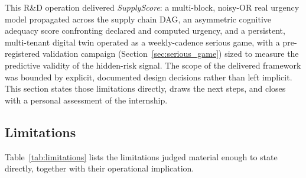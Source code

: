 This R\&D operation delivered \emph{SupplyScore}: a multi-block, noisy-OR real urgency model propagated across the supply chain DAG, an asymmetric cognitive adequacy score confronting declared and computed urgency, and a persistent, multi-tenant digital twin operated as a weekly-cadence serious game, with a pre-registered validation campaign (Section~\ref{sec:serious_game}) sized to measure the predictive validity of the hidden-risk signal. The scope of the delivered framework was bounded by explicit, documented design decisions rather than left implicit. This section states those limitations directly, draws the next steps, and closes with a personal assessment of the internship.

\subsection{Limitations}
\label{sec:limitations}

Table~\ref{tab:limitations} lists the limitations judged material enough to state directly, together with their operational implication.

